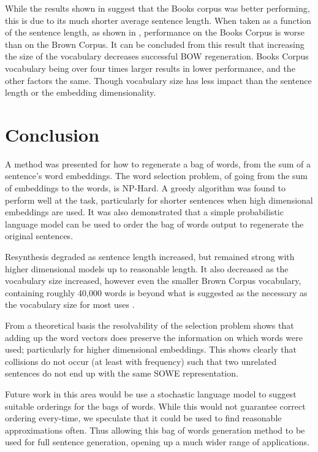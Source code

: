 \documentclass{llncs}
\begin{document}
While the results shown in  suggest that the Books corpus was better performing, this is due to its much shorter average sentence length. When taken as a function of the sentence length, as shown in ,  performance on the Books Corpus is worse than on the Brown Corpus. It can be concluded from this result that increasing the size of the vocabulary decreases successful BOW regeneration. Books Corpus vocabulary being over four times larger results in lower performance, and the other factors the same. Though vocabulary size has less impact than the sentence length or the embedding dimensionality.


\section{Conclusion} \label{conclusion}
A method was presented for how to regenerate a bag of words, from the sum of a sentence's word embeddings. The word selection problem, of going from the sum of embeddings to the words, is NP-Hard. A greedy algorithm was found to perform well at the task, particularly for shorter sentences when high dimensional embeddings are used. It was also demonstrated that a simple probabilistic language model can be used to order the bag of words output to regenerate the original sentences.

Resynthesis degraded as sentence length increased, but remained strong with higher dimensional models up to reasonable length. It also decreased as the vocabulary size increased, however even the smaller Brown Corpus vocabulary, containing roughly 40,000 words is beyond what is suggested as the necessary  as the vocabulary size for most uses \parencite{nation2006large}.

From a theoretical basis the resolvability of the selection problem shows that adding up the word vectors does preserve the information on which words were used; particularly for higher dimensional embeddings. This shows clearly that collisions do not occur (at least with frequency) such that two unrelated sentences do not end up with the same SOWE representation. 

Future work in this area would be use a stochastic language model to suggest suitable orderings for the bags of words. While this would not guarantee correct ordering every-time, we speculate that it could be used to find reasonable approximations often. Thus allowing this bag of words generation method to be used for full sentence generation, opening up a much wider range of applications.

\printbibliography
	
\end{document}
